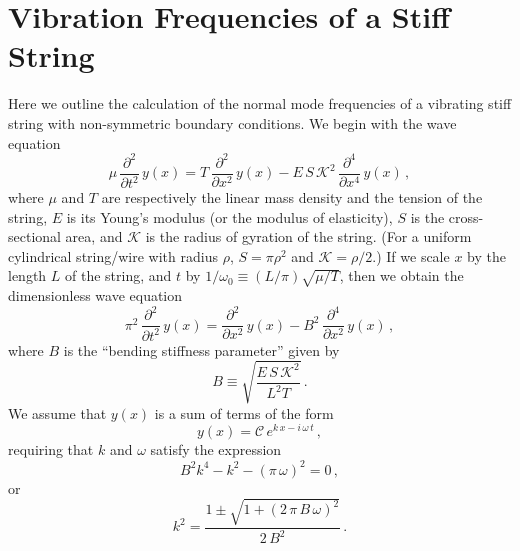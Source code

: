 %
%
%

 \section{Vibration Frequencies of a Stiff String\label{app:freq}}

Here we outline the calculation of the normal mode frequencies of a vibrating stiff string with non-symmetric boundary conditions. We begin with the wave equation~\cite{ref:fletcher1964nvf}
 \begin{equation}
\mu\, \frac{\partial^2}{\partial t^2}\, y(x) = T\, \frac{\partial^2}{\partial x^2}\, y(x) - E\, S\, \mathcal{K}^2\, \frac{\partial^4}{\partial x^4}\, y (x)\, ,
 \end{equation}
where $\mu$ and $T$ are respectively the linear mass density and the tension of the string, $E$ is its Young's modulus (or the modulus of elasticity), $S$ is the cross-sectional area, and $\mathcal{K}$ is the radius of gyration of the string. (For a uniform cylindrical string/wire with radius $\rho$, $S = \pi \rho^2$ and $\mathcal{K} = \rho/2$.) If we scale $x$ by the length $L$ of the string, and $t$ by $1/\omega_0 \equiv  (L/\pi) \sqrt{\mu/T}$, then we obtain the dimensionless wave equation
 \begin{equation} \label{eqn:wave_eqn_dim}
\pi^2\, \frac{\partial^2}{\partial t^2}\, y(x) = \frac{\partial^2}{\partial x^2}\, y(x) - B^2\, \frac{\partial^4}{\partial x^2}\, y (x)\, ,
 \end{equation}
where $B$ is the ``bending stiffness parameter'' given by
 \begin{equation}
B \equiv \sqrt{\frac{E\, S\, \mathcal{K}^2}{L^2 T}}\, .
 \end{equation}
We assume that $y(x)$ is a sum of terms of the form
 \begin{equation}
y(x) = \mathcal{C}\, e^{k\, x - i\, \omega\, t}\, ,
 \end{equation}
requiring that $k$ and $\omega$ satisfy the expression
 \begin{equation} \label{eqn:kw}
B^2 k^4 - k^2 - (\pi\, \omega)^2 = 0\, ,
 \end{equation}
or
 \begin{equation}
k^2 = \frac{1 \pm \sqrt{1 + (2\, \pi\, B\, \omega)^2}}{2\, B^2}\, .
 \end{equation}
